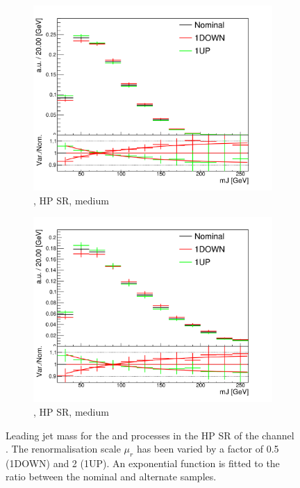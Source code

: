 \begin{figure}[!htbp]
\begin{subfigure}{.5\textwidth}
  \end{subfigure}
  \begin{subfigure}{.5\textwidth}
    \includegraphics[width=\textwidth]{chapters/6.vhbb_boosted/figs/0L_Zhf_2tag1pfat0jet_250_400ptv_SR_noaddbjetsr_mJIncl_SysMUR.pdf}
    \caption{\Zhf, HP SR, medium \pTV}
    \label{fig:Vjets_SysMUR_sub3}
  \end{subfigure}%
  \hfill
  \begin{subfigure}{.5\textwidth}
    \includegraphics[width=\textwidth]{chapters/6.vhbb_boosted/figs/0L_Zhf_2tag1pfat0jet_400ptv_SR_noaddbjetsr_mJIncl_SysMUR.pdf}
    \caption{\Zhf, HP SR, medium  \pTV}
    \label{fig:Vjets_SysMUR_sub4}
  \end{subfigure}%
  \hfill
  \caption{Leading \largeR jet mass for the  \Zboson and \Whf processes in the HP SR of the \zlep channel \cite{Dao:2688371}. The renormalisation scale $\mu_r$ has been varied by a factor of 0.5 (1DOWN) and 2 (1UP). An exponential function is fitted to the ratio between the nominal and alternate samples.}
  \label{fig:Vjets_SysMUR}
\end{figure}


